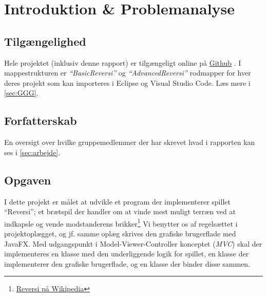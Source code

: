 \section{Introduktion \& Problemanalyse}
\subsection{Tilgængelighed}\label{sec:introtilg}
Hele projektet (inklusiv denne rapport) er tilgængeligt online på \href{https://github.com/rwiuff/Reversi}{\color{DTUred}Github} . I mappestrukturen er \emph{``BasicReversi''} og \emph{``AdvancedReversi''} rodmapper for hver deres projekt som kan importeres i Eclipse og Visual Studio Code. Læs mere i \cref{sec:GGG}.
\subsection{Forfatterskab}
En oversigt over hvilke gruppemedlemmer der har skrevet hvad i rapporten kan ses i \cref{sec:arbejde}.
\subsection{Opgaven}\label{OP}
I dette projekt er målet at udvikle et program der implementerer spillet ``Reversi''; et brætspil der handler om at vinde mest muligt terræn ved at indkapsle og vende modstanderens brikker\footnote{\href{https://www.wikiwand.com/en/Reversi}{Reversi på Wikipedia}} Vi benytter os af regelsættet i projektoplægget, og jf. samme oplæg skrives den grafiske brugerflade med JavaFX.\newline
Med udgangspunkt i Model-Viewer-Controller konceptet (\emph{MVC}) skal der implementeres en klasse med den underliggende logik for spillet, en klasse der implementerer den grafiske brugerflade, og en klasse der binder disse sammen.
